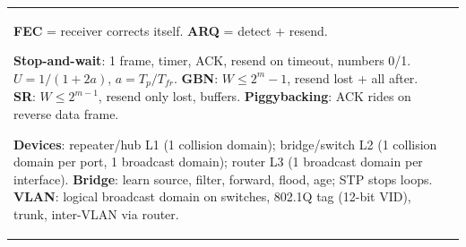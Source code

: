 \documentclass[10pt]{article}
\begin{document}
\begin{cheatsheet}
\begin{tabularx}{\linewidth}{@{}XX@{}}
\textbf{FEC} = receiver corrects itself. \textbf{ARQ} = detect + resend.

\textbf{Stop-and-wait}: 1 frame, timer, ACK, resend on timeout, numbers 0/1. $U = 1/(1+2a)$, $a = T_p/T_{fr}$.\newline
\textbf{GBN}: $W \le 2^m - 1$, resend lost + all after. \textbf{SR}: $W \le 2^{m-1}$, resend only lost, buffers.\newline
\textbf{Piggybacking}: ACK rides on reverse data frame.

\textbf{Devices}: repeater/hub L1 (1 collision domain); bridge/switch L2 (1 collision domain per port, 1 broadcast domain); router L3 (1 broadcast domain per interface).\newline
\textbf{Bridge}: learn source, filter, forward, flood, age; STP stops loops.\newline
\textbf{VLAN}: logical broadcast domain on switches, 802.1Q tag (12-bit VID), trunk, inter-VLAN via router.
\end{tabularx}
\end{cheatsheet}
\end{document}
